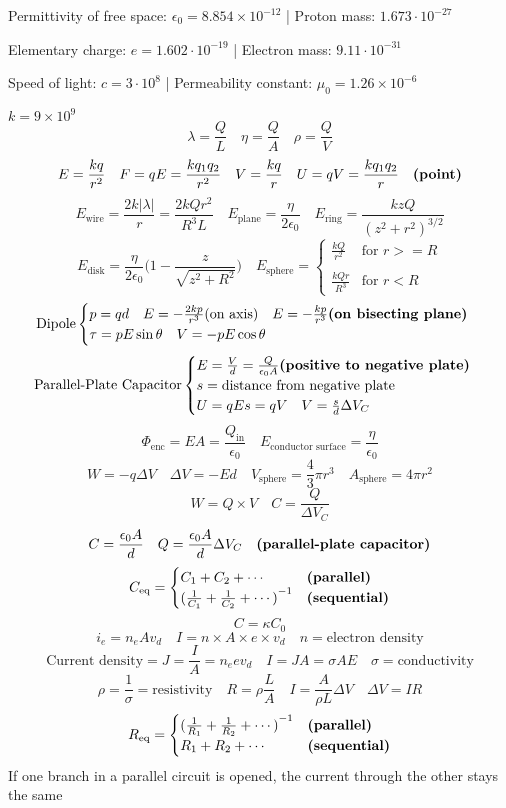 \documentclass[8pt,twocolumn]{extarticle}
\begin{document}
Permittivity of free space: $\epsilon_0 = 8.854\times 10^{-12}$ |
Proton mass: $1.673\cdot 10^{-27}$

Elementary charge: $e = 1.602\cdot 10^{-19}$ |
Electron mass: $9.11\cdot 10^{-31}$

Speed of light: $c=3\cdot 10^8$ |
Permeability constant: $\mu_0 = 1.26\times 10^{-6}$

$k=9\times 10^9$
\[\lambda = \frac{Q}{L}\quad\eta = \frac{Q}{A}\quad\rho = \frac{Q}{V}\]
\[E=\frac{kq}{r^2}\quad F=qE=\frac{kq_1 q_2}{r^2}\quad V=\frac{kq}{r}\quad U=qV=\frac{kq_1 q_2}{r}\quad\text{\textbf{(point)}}\]
\[E_\text{wire}=\frac{2k|\lambda |}{r}=\frac{2kQ r^2}{R^3 L}\quad E_\text{plane}=\frac{\eta}{2\epsilon_0}\quad E_\text{ring}=\frac{kzQ}{{(z^2 + r^2)}^{3/2}}\]
\[E_\text{disk}=\frac{\eta}{2\epsilon_0}\Big(1-\frac{z}{\sqrt{z^2 + R^2}}\Big)\quad E_\text{sphere}=\begin{cases}
    \frac{kQ}{r^2} & \text{for } r >= R \\ \\
    \frac{kQr}{R^3} & \text{for } r < R
\end{cases}\]
\[\text{Dipole}\begin{cases}
    p=qd\quad E=-\frac{2kp}{r^3}\text{(on axis)}\quad E=-\frac{kp}{r^3}\text{\textbf{(on bisecting plane)}} \\
    \tau = pE\sin\theta\quad V = -pE\cos\theta
\end{cases}\]
\[\text{Parallel-Plate Capacitor}\begin{cases}
    E=\frac{V}{d}=\frac{Q}{\epsilon_0 A}\text{\textbf{(positive to negative plate)}} \\
    s=\text{distance from negative plate} \\
    U=qEs=qV \quad V=\frac{s}{d}\Delta V_C
\end{cases}\]
\[\Phi_\text{enc}=EA=\frac{Q_\text{in}}{\epsilon_0}\quad E_\text{conductor surface}=\frac{\eta}{\epsilon_0}\]
\[W=-q\Delta V\quad \Delta V = -Ed\quad V_\text{sphere} = \frac{4}{3}\pi r^3\quad A_\text{sphere}=4\pi r^2\]
\[W=Q\times V\quad C = \frac{Q}{\Delta V_C}\]
\[C=\frac{\epsilon_0 A}{d}\quad Q = \frac{\epsilon_0 A}{d} \Delta V_C\quad\text{\textbf{(parallel-plate capacitor)}}\]
\[C_\text{eq}=\begin{cases}
    C_1 + C_2 + \cdots & \text{\textbf{(parallel)}} \\
    {(\frac{1}{C_1} + \frac{1}{C_2} + \cdots)}^{-1} & \text{\textbf{(sequential)}}
\end{cases}\]
\[C=\kappa C_0\]
\[i_e = n_e Av_d\quad I = n\times A\times e\times v_d\quad n=\text{electron density}\]
\[\text{Current density}=J=\frac{I}{A}=n_e e v_d\quad I = JA = \sigma AE\quad \sigma = \text{conductivity}\]
\[\rho = \frac{1}{\sigma} = \text{resistivity}\quad R=\rho \frac{L}{A}\quad I=\frac{A}{\rho L}\Delta V\quad \Delta V = IR\]
\[R_\text{eq}=\begin{cases}
    {(\frac{1}{R_1} + \frac{1}{R_2} + \cdots)}^{-1} & \text{\textbf{(parallel)}} \\
    R_1 + R_2 + \cdots & \text{\textbf{(sequential)}}
\end{cases}\]
If one branch in a parallel circuit is opened, the current through the other stays the same
\vspace{1em}
\end{document}
